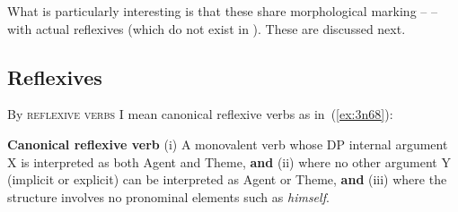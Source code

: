 \begin{exe}
\begin{xlist}
\begin{xlist}
\begin{exe}
\begin{xlist}
\begin{xlist}
\begin{exe}
\begin{xlist}
\begin{xlist}
\begin{exe}
\begin{exe}
\begin{xlist}
\begin{exe}
\begin{exe}
\begin{xlist}
\begin{exe}
\begin{exe}
\begin{exe}
\begin{exe}
\begin{exe}
\begin{xlist}
\begin{exe}
\begin{xlist}
\begin{exe}
\begin{exe}
\begin{xlist}
\begin{exe}
\begin{xlist}
\begin{exe}
\begin{exe}
\begin{exe}
\begin{xlist}
\begin{exe}
\begin{exe}
\begin{exe}
\begin{xlist}
\begin{exe}
\begin{xlist}
\begin{exe}
\begin{xlist}
\begin{exe}
\begin{xlist}
\begin{exe}
\begin{exe}
\begin{exe}
\begin{exe}
\begin{xlist}
\begin{exe}
\begin{xlist}
\begin{exe}
\begin{xlist}
\begin{exe}
\begin{xlist}
\begin{exe}
\begin{xlist}
\begin{exe}
\begin{xlist}
\begin{exe}
\begin{exe}
\begin{exe}
\begin{exe}
\begin{xlist}
\begin{exe}
\begin{xlist}
\begin{exe}
\begin{xlist}
\begin{exe}
\begin{exe}
\begin{xlist}
\begin{exe}
\begin{exe}
\begin{exe}
\begin{exe}
\begin{xlist}
\begin{xlist}
\begin{exe}
\begin{xlist}
\begin{exe}
\begin{exe}
\begin{exe}
\begin{xlist}
\begin{exe}
\begin{exe}
\begin{xlist}
What is particularly interesting is that these  share morphological marking -- \thit -- with actual reflexives (which do not exist in {\tnif}). These are discussed next.

	\subsection{Reflexives} \label{vz:thit:refl}
By \textsc{reflexive verbs} I mean canonical reflexive verbs as in~(\ref{ex:3n68}):
 \begin{exe}
\ex  \label{ex:3n68}\textbf{Canonical reflexive verb} 
	(i) A monovalent verb whose DP internal argument X is interpreted as both Agent and Theme, \textbf{and} (ii) where no other argument Y (implicit or explicit) can be interpreted as Agent or Theme, \textbf{and} (iii) where the structure involves no pronominal elements such as \emph{himself}.
 \z 


\end{exe}
\end{xlist}
\end{exe}
\end{exe}
\end{xlist}
\end{exe}
\end{exe}
\end{exe}
\end{xlist}
\end{exe}
\end{xlist}
\end{xlist}
\end{exe}
\end{exe}
\end{exe}
\end{exe}
\end{xlist}
\end{exe}
\end{exe}
\end{xlist}
\end{exe}
\end{xlist}
\end{exe}
\end{xlist}
\end{exe}
\end{exe}
\end{exe}
\end{exe}
\end{xlist}
\end{exe}
\end{xlist}
\end{exe}
\end{xlist}
\end{exe}
\end{xlist}
\end{exe}
\end{xlist}
\end{exe}
\end{xlist}
\end{exe}
\end{exe}
\end{exe}
\end{exe}
\end{xlist}
\end{exe}
\end{xlist}
\end{exe}
\end{xlist}
\end{exe}
\end{xlist}
\end{exe}
\end{exe}
\end{exe}
\end{xlist}
\end{exe}
\end{exe}
\end{exe}
\end{xlist}
\end{exe}
\end{xlist}
\end{exe}
\end{exe}
\end{xlist}
\end{exe}
\end{xlist}
\end{exe}
\end{exe}
\end{exe}
\end{exe}
\end{exe}
\end{xlist}
\end{exe}
\end{exe}
\end{xlist}
\end{exe}
\end{exe}
\end{xlist}
\end{xlist}
\end{exe}
\end{xlist}
\end{xlist}
\end{exe}
\end{xlist}
\end{xlist}
\end{exe}
